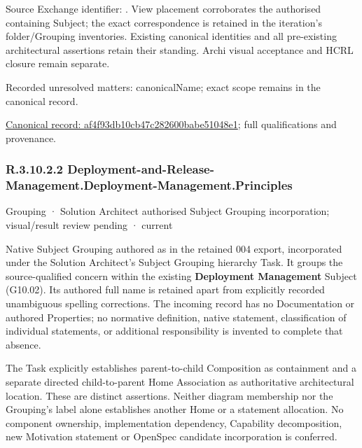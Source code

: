 Source Exchange identifier: \texttt{}. View placement corroborates
the authorised containing Subject; the exact correspondence is retained in the
iteration's folder/Grouping inventories. Existing canonical identities and all
pre-existing architectural assertions retain their standing. Archi visual
acceptance and HCRL closure remain separate.


{\small Recorded unresolved matters: canonicalName; exact scope remains in the canonical record.}\par
{\footnotesize \href{../../../../continuum/grouping/af4f93db10cb47c282600babe51048e1.md}{Canonical record: af4f93db10cb47c282600babe51048e1}; full qualifications and provenance.}\par
\subsubsection*{R.3.10.2.2 Deployment-and-Release-Management.Deployment-Management.Principles}
\label{navigation:R.3.10.2.2}

\label{element:50a4cb6b01c94904a0991175ab09004c}
{\small Grouping · Solution Architect authorised Subject Grouping incorporation; visual/result review pending · current}\par

Native Subject Grouping authored as \texttt{} in the retained 004 export,
incorporated under the Solution Architect's Subject Grouping hierarchy Task.
It groups the source-qualified \texttt{} concern within
the existing \textbf{Deployment Management} Subject (G10.02). Its authored full name
is retained apart from explicitly recorded unambiguous spelling corrections.
The incoming record has no Documentation or authored Properties; no normative
definition, native statement, classification of individual statements, or
additional responsibility is invented to complete that absence.



The Task explicitly establishes parent-to-child Composition as containment and
a separate directed child-to-parent Home Association as authoritative architectural
location. These are distinct assertions. Neither diagram membership nor the
Grouping's label alone establishes another Home or a statement allocation.
No component ownership, implementation dependency, Capability decomposition,
new Motivation statement or OpenSpec candidate incorporation is conferred.



